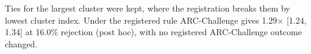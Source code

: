 Ties for the largest cluster were kept, where the registration breaks them by lowest cluster index. Under the registered rule ARC-Challenge gives 1.29$\times$ [1.24, 1.34] at 16.0\% rejection (post hoc), with no registered ARC-Challenge outcome changed.%
